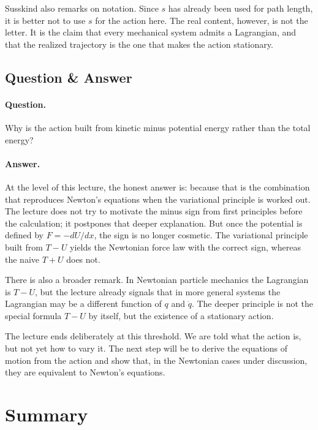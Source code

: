 Susskind also remarks on notation. Since \(s\) has already been used for path length, it is better not to use \(s\) for the action here. The real content, however, is not the letter. It is the claim that every mechanical system admits a Lagrangian, and that the realized trajectory is the one that makes the action stationary.

\subsection{Question \& Answer}

\paragraph{Question.} Why is the action built from kinetic minus potential energy rather than the total energy?

\paragraph{Answer.} At the level of this lecture, the honest answer is: because that is the combination that reproduces Newton's equations when the variational principle is worked out. The lecture does not try to motivate the minus sign from first principles before the calculation; it postpones that deeper explanation. But once the potential is defined by \(F=-dU/dx\), the sign is no longer cosmetic. The variational principle built from \(T-U\) yields the Newtonian force law with the correct sign, whereas the naive \(T+U\) does not.

There is also a broader remark. In Newtonian particle mechanics the Lagrangian is \(T-U\), but the lecture already signals that in more general systems the Lagrangian may be a different function of \(q\) and \(\dot q\). The deeper principle is not the special formula \(T-U\) by itself, but the existence of a stationary action.

The lecture ends deliberately at this threshold. We are told what the action is, but not yet how to vary it. The next step will be to derive the equations of motion from the action and show that, in the Newtonian cases under discussion, they are equivalent to Newton's equations.

\section{Summary}

